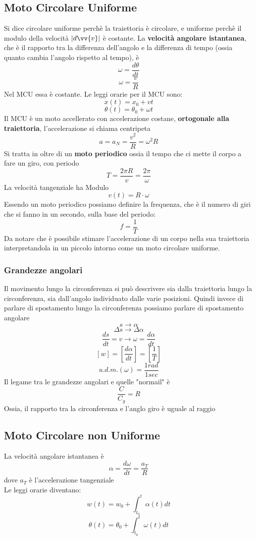 \documentclass[a4paper]{report}
\begin{document}
  \subsection{Moto Circolare Uniforme}
  Si dice circolare uniforme perchè la traiettoria è circolare, e uniforme perchè il modulo della velocità $|d\vv{v}|$ è costante.
  La \textbf{velocità angolare istantanea}, che è il rapporto tra la differenza dell'angolo e la differenza di tempo (ossia quanto cambia l'angolo rispetto al tempo), è
  $$ \omega = \frac{d\theta}{dt} $$
  $$ \omega = \frac{v}{R} $$
  Nel MCU essa è costante. Le leggi orarie per il MCU sono:
  $$ x(t) =x_0 + vt$$
  $$ \theta(t) = \theta_0 + \omega t$$
  Il MCU è un moto accellerato con accelerazione costane, \textbf{ortogonale alla traiettoria}, l'accelerazione si chiama centripeta
  $$ a= a_N = \frac{v^2}{R} = \omega^2 R$$
  Si tratta in oltre di un \textbf{moto periodico} ossia il tempo che ci mette il corpo a fare un giro, con periodo
  $$ T=\frac{2\pi R}{v} = \frac{2\pi}{\omega} $$
  La velocità tangenziale ha Modulo
  $$ v(t) = R \cdot \omega $$
  Essendo un moto periodico possiamo definire la frequenza, che è il numero di giri che si fanno in un secondo, sulla base del periodo:
  $$ f = \frac{1}{T}$$
  Da notare che è possibile stimare l'accelerazione di un corpo nella sua traiettoria interpretandola in un piccolo intorno come un moto circolare uniforme.
  \subsubsection{Grandezze angolari}
  Il movimento lungo la circonferenza si può descrivere sia dalla traiettoria lungo la circonferenza, sia dall'angolo individuato dalle varie posizioni. Quindi invece di parlare di spostamento lungo la circonferenza possiamo parlare di spostamento angolare
  $$ s \rightarrow \alpha$$
  $$ \Delta s \rightarrow \Delta \alpha$$
  $$ \frac{ds}{dt} = v \rightarrow \omega = \frac{d\alpha}{dt}$$
  $$[w] = [\frac{d\alpha}{dt}] = [\frac{1}{T}]$$
  $$ u.d.m.(\omega) = \frac{1 rad}{1 sec}$$
  Il legame tra le grandezze angolari e quelle "normail" è
  $$\frac{C}{C_g} = R$$
  Ossia, il rapporto tra la circonferenza e l'anglo giro è uguale al raggio

  \subsection{Moto Circolare non Uniforme}
  La velocità angolare istantanea è
  $$ \alpha = \frac{d\omega}{dt} = \frac{a_T}{R} $$
  dove $a_T$ è l'accelerazione tangenziale\\
  Le leggi orarie diventano:
  $$ w(t) = w_0 + \int_{t_0}^t \alpha(t) dt $$
  $$ \theta(t) = \theta_0 + \int_{t_0}^t \omega(t) dt $$
\end{document}
